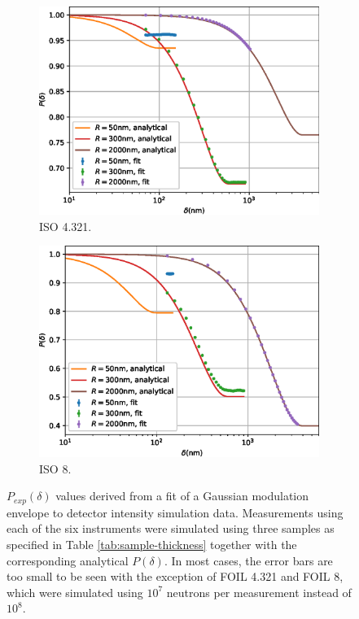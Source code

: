 \begin{figure}[p]
\begin{subfigure}[b]{0.45\textwidth}
		\includegraphics[width=\textwidth]{simulation-plot-gauss-ISO-4.321}
		\caption{ISO 4.321.}
		\label{fig:simulation-plot-gauss-ISO-4.321}
	\end{subfigure}
	\hfill
	\begin{subfigure}[b]{0.45\textwidth}
		\centering
		\includegraphics[width=\textwidth]{simulation-plot-gauss-ISO-8}
		\caption{ISO 8.}
		\label{fig:simulation-plot-gauss-ISO-8}
	\end{subfigure}
	\caption{$P_{exp}(\delta)$ values derived from a fit of a Gaussian modulation envelope to detector intensity simulation data. Measurements using each of the six instruments were simulated using three samples as specified in Table \ref{tab:sample-thickness} together with the corresponding analytical $P(\delta)$. In most cases, the error bars are too small to be seen with the exception of FOIL 4.321 and FOIL 8, which were simulated using $10^7$ neutrons per measurement instead of $10^8$.}
	\label{fig:simulation-plot-gauss}
\end{figure}

